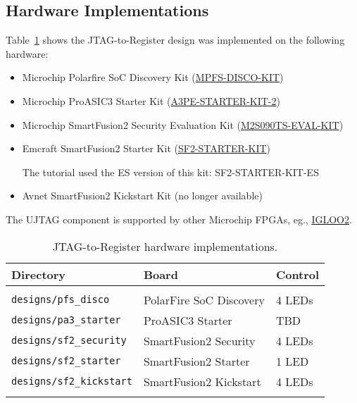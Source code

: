 \subsection{Hardware Implementations}

Table~\ref{tab:jtag_to_register_hardware} shows the JTAG-to-Register
design was implemented on the following hardware:
%
\begin{itemize}
\item Microchip Polarfire SoC Discovery Kit
(\href{https://www.microchip.com/en-us/development-tool/mpfs-disco-kit}
{MPFS-DISCO-KIT})

\item Microchip ProASIC3 Starter Kit
(\href{https://www.microchip.com/en-us/development-tool/a3pe-starter-kit-2}
{A3PE-STARTER-KIT-2})

\item Microchip SmartFusion2 Security Evaluation Kit
(\href{https://www.microchip.com/en-us/development-tool/m2s090ts-eval-kit}
{M2S090TS-EVAL-KIT})

\item Emcraft SmartFusion2 Starter Kit
(\href{https://emcraft.com/products/153}{SF2-STARTER-KIT})

The tutorial used the ES version of this kit: SF2-STARTER-KIT-ES

\item Avnet SmartFusion2 Kickstart Kit (no longer available)

\end{itemize}
%
The UJTAG component is supported by other Microchip FPGAs, eg.,
\href{https://www.microchip.com/en-us/development-tool/m2gl-eval-kit}{IGLOO2}.

%
\begin{table}
\caption{JTAG-to-Register hardware implementations.}
\label{tab:jtag_to_register_hardware}
\begin{center}
\begin{tabular}{|l|l|l|}
\hline
Directory & Board & Control\\
\hline\hline
&&\\
\texttt{designs/pfs\_disco}     & PolarFire SoC Discovery & 4 LEDs\\
\texttt{designs/pa3\_starter}   & ProASIC3 Starter        & TBD\\
\texttt{designs/sf2\_security}  & SmartFusion2 Security   & 4 LEDs\\
\texttt{designs/sf2\_starter}   & SmartFusion2 Starter    & 1 LED\\
\texttt{designs/sf2\_kickstart} & SmartFusion2 Kickstart  & 4 LEDs\\
&&\\
\hline
\end{tabular}
\end{center}
\end{table}
